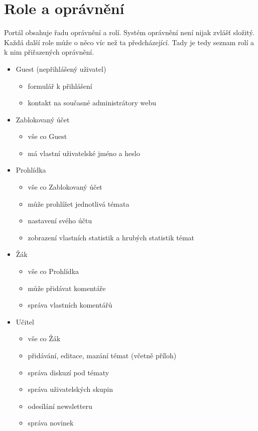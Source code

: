 \documentclass[thesis=B,czech]{FITthesis}[2012/06/26]
\begin{document}
\section{Role a oprávnění}

Portál obsahuje řadu oprávnění a rolí. Systém oprávnění není nijak zvlášť složitý. Každá další role může o něco víc než ta předcházející. Tady je tedy seznam rolí a k nim přiřazených oprávnění.

\begin{itemize}
	\item Guest (nepřihlášený uživatel)
	\begin{itemize}
		\item formulář k přihlášení
		\item kontakt na současné administrátory webu
	\end{itemize}
	
	\item Zablokovaný účet
	\begin{itemize}
		\item vše co Guest
		\item má vlastní uživatelské jméno a heslo
	\end{itemize}

	\item Prohlídka
	\begin{itemize}
		\item vše co Zablokovaný účet
		\item může prohlížet jednotlivá témata
		\item nastavení svého účtu
		\item zobrazení vlastních statistik a hrubých statistik témat
	\end{itemize}

	\item Žák
	\begin{itemize}
		\item vše co Prohlídka
		\item může přidávat komentáře
		\item správa vlastních komentářů		
	\end{itemize}

	\item Učitel
	\begin{itemize}
		\item vše co Žák
		\item přidávání, editace, mazání témat (včetně příloh)
		\item správa diskuzí pod tématy
		\item správa uživatelských skupin
		\item odesílání newsletteru
		\item 	správa novinek
	\end{itemize}


\end{itemize}
\end{document}
